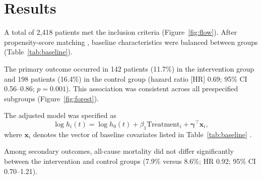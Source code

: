 \section{Results}
\label{sec:results}

A total of 2,418 patients met the inclusion criteria (Figure~\ref{fig:flow}). After propensity-score matching \cite{austin2011introduction}, baseline characteristics were balanced between groups (Table~\ref{tab:baseline}).

The primary outcome occurred in 142 patients (11.7\%) in the intervention group and 198 patients (16.4\%) in the control group (hazard ratio [HR] 0.69; 95\% CI 0.56--0.86; $p = 0.001$). This association was consistent across all prespecified subgroups (Figure~\ref{fig:forest}).

The adjusted model was specified as
\begin{equation}
  \log h_i(t) = \log h_0(t) + \beta_1 \text{Treatment}_i + \boldsymbol{\gamma}^\top \mathbf{x}_i ,
  \label{eq:cox}
\end{equation}
where $\mathbf{x}_i$ denotes the vector of baseline covariates listed in Table~\ref{tab:baseline} \cite{cox1972regression, therneau2000modeling}.

Among secondary outcomes, all-cause mortality did not differ significantly between the intervention and control groups (7.9\% versus 8.6\%; HR 0.92; 95\% CI 0.70--1.21).
